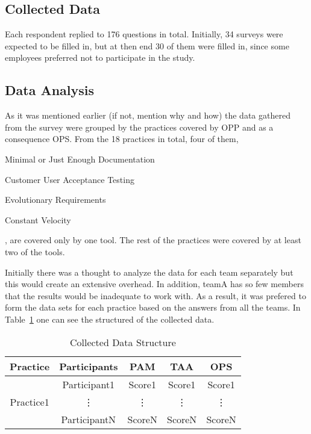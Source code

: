 \subsection{Collected Data}
Each respondent replied to 176 questions in total. Initially, 34 surveys were expected to be filled in, but at then end 30 of them were filled in, since some employees preferred not to participate in the study.

\subsection{Data Analysis}
As it was mentioned earlier (if not, mention why and how) the data gathered from the survey were grouped by the practices covered by OPP and as a consequence OPS. From the 18 practices in total, four of them, \begin{inparaenum} [a\upshape)] \item Minimal or Just Enough Documentation \item Customer User Acceptance Testing \item Evolutionary Requirements \item Constant Velocity \end{inparaenum}, are covered only by one tool. The rest of the practices were covered by at least two of the tools.

Initially there was a thought to analyze the data for each team separately but this would create an extensive overhead. In addition, teamA has so few members that the results would be inadequate to work with. As a result, it was prefered to form the data sets for each practice based on the answers from all the teams. In Table~\ref{table:data_structure} one can see the structured of the collected data.

\begin{table} [H]
	\caption{Collected Data Structure}
	\label{table:data_structure}
	\begin{tabular}{| c | c | c | c | c |} \hline
	\textbf{Practice} & \textbf{Participants} & \textbf{PAM} & \textbf{TAA} & \textbf{OPS} \\ \hline
	\multirow{3}{*}{Practice1} & Participant1 & Score1 & Score1 & Score1 \\ \hhline{~----}
	& \vdots & \vdots & \vdots  & \vdots \\ \hhline{~----}
	& ParticipantN & ScoreN & ScoreN & ScoreN \\ \hline
	\end{tabular}
\end{table}

